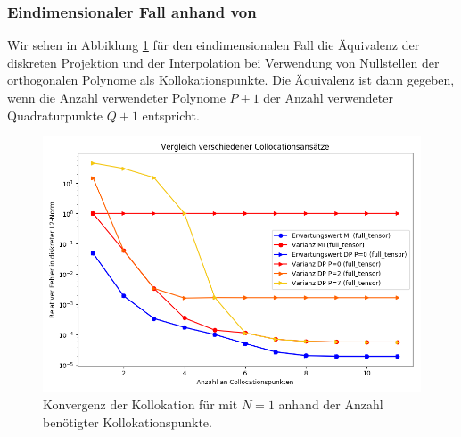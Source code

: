 \subsubsection*{Eindimensionaler Fall anhand von }
Wir sehen in Abbildung \ref{fig:Kollokation_comparison_trial7} für den eindimensionalen Fall die Äquivalenz der diskreten Projektion und der Interpolation bei Verwendung von Nullstellen der orthogonalen Polynome als Kollokationspunkte. Die Äquivalenz ist dann gegeben, wenn die Anzahl verwendeter Polynome $P+1$ der Anzahl verwendeter Quadraturpunkte $Q+1$ entspricht.
\begin{figure}[!htb]
\includegraphics[width=\textwidth]{Figures/collocation_midp_trial7.png}
\caption{Konvergenz der Kollokation für  mit $N=1$ anhand der Anzahl benötigter Kollokationspunkte.}
\label{fig:Kollokation_comparison_trial7}
\end{figure}

